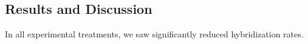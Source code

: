 \subsection{Results and Discussion}

In all experimental treatments, we saw significantly reduced hybridization rates.


